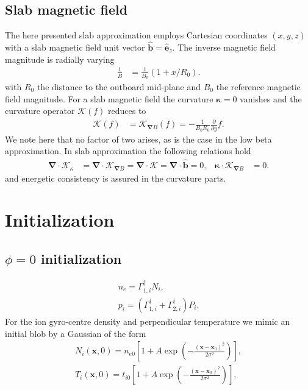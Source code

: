 \documentclass{hitec} %
\renewcommand{\vec}[1]{\boldsymbol{#1}}
\begin{document}
\subsection{Slab magnetic field}\label{sec:slabapprox}
The here presented slab approximation employs Cartesian coordinates \((x,y,z)\) with a slab magnetic field unit vector \(\vec{\hat{b}} = \vec{\hat{e}}_z\). The inverse magnetic field magnitude is 
radially varying 
\begin{align}
 \frac{1}{B}&= \frac{1}{B_0} \left( 1+x/R_0\right) .
\end{align}
with \(R_0\) the distance to the outboard mid-plane and \(B_0\) the reference magnetic field magnitude. 
For a slab magnetic field the curvature \(\vec{\kappa} = 0\) vanishes and the curvature operator \(\mathcal{K} (f)\) reduces to
\begin{align}
  \mathcal{K} (f) &=\mathcal{K}_{\vec{\nabla}  B} (f) =-\frac{1}{B_0 R_0 } \frac{\partial }{\partial y }f.
\end{align}
We note here that no factor of two arises, as is the case in the low beta approximation. In slab approximation the following relations hold
\begin{align}
   \vec{\nabla} \cdot  \vec{\mathcal{K}}_{\kappa} &=   \vec{\nabla} \cdot \vec{\mathcal{K}}_{\vec{\nabla}  B} =  \vec{\nabla} \cdot \vec{ \mathcal{K}} =   \vec{\nabla} \cdot \vec{\hat{b}} =  0,     
    &  \vec{\kappa} \cdot \vec{\mathcal{K}}_{\vec{\nabla}  B} &= 0.
\end{align}
and energetic consistency is assured in the curvature parts.
\section{Initialization}
\subsection{\(\phi=0\) initialization}
\begin{align}
  n_e  =\Gamma_{1,i}^\dagger N_i, \\ 
 p_{i} = \left(\Gamma_{1,i}^{\dagger} + \Gamma_{2,i}^{\dagger} \right)P_{i} .
\end{align}
For the ion gyro-centre density and perpendicular temperature we mimic an initial blob by a Gaussian of the form
\begin{eqnarray}
 N_{i}\left(\vec{x},0\right) =   n_{e0}\left[1+A \exp{\left(-\frac{\left(\vec{x}-\vec{x}_0\right)^2}{2\sigma^2}\right)}\right],  \\
 T_{i}\left(\vec{x},0\right) =   t_{i0}\left[1+A \exp{\left(-\frac{\left(\vec{x}-\vec{x}_0\right)^2}{2\sigma^2}\right)} \right],
\end{eqnarray}
\end{document}
